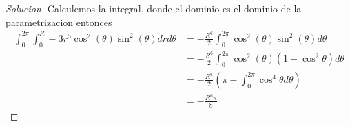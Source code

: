 \documentclass{article}
\theoremstyle{definition}
\newenvironment{solution}{\begin{proof}[Solucion]}{\end{proof}}
\begin{document}
\begin{solution}
  Calculemos la integral, donde el dominio es el dominio de la parametrizacion entonces
  \begin{align*}
    \int_{0}^{2\pi}\int_{0}^{R} -3r^{5}\cos^{2}(\theta)\sin^{2}(\theta) drd\theta &= -\frac{R^{6}}{2} \int_{0}^{2\pi}\cos^{2}(\theta)\sin^{2}(\theta) d\theta\\
                                                                                  &= -\frac{R^{6}}{2} \int_{0}^{2\pi} \cos^{2}(\theta)(1 - \cos^{2} \theta) d\theta\\
                                                                                  &= -\frac{R^{6}}{2} (\pi - \int_{0}^{2\pi} \cos^{4} \theta d \theta)\\
    &= -\frac{R^{6}\pi}{8}
  \end{align*}
\end{solution}
\end{document}
